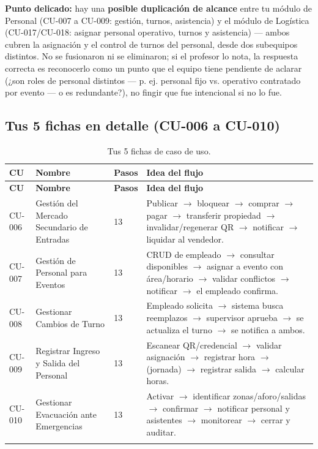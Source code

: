 \documentclass[12pt,a4paper]{article}
\begin{document}
\begin{alerta}
\textbf{Punto delicado:} hay una \textbf{posible duplicación de alcance} entre tu módulo de
Personal (CU-007 a CU-009: gestión, turnos, asistencia) y el módulo de Logística (CU-017/CU-018:
asignar personal operativo, turnos y asistencia) --- ambos cubren la asignación y el control de
turnos del personal, desde dos subequipos distintos. No se fusionaron ni se eliminaron; si el
profesor lo nota, la respuesta correcta es reconocerlo como un punto que el equipo tiene pendiente
de aclarar (¿son roles de personal distintos --- p. ej. personal fijo vs. operativo contratado por
evento --- o es redundante?), no fingir que fue intencional si no lo fue.
\end{alerta}

\subsection{Tus 5 fichas en detalle (CU-006 a CU-010)}

\begin{longtable}{p{1.6cm}p{4cm}p{1.3cm}p{6.9cm}}
\toprule
\textbf{CU} & \textbf{Nombre} & \textbf{Pasos} & \textbf{Idea del flujo}\\
\midrule
\endfirsthead
\toprule
\textbf{CU} & \textbf{Nombre} & \textbf{Pasos} & \textbf{Idea del flujo}\\
\midrule
\endhead
CU-006 & Gestión del Mercado Secundario de Entradas & 13 & Publicar $\to$ bloquear $\to$ comprar
$\to$ pagar $\to$ transferir propiedad $\to$ invalidar/regenerar QR $\to$ notificar $\to$ liquidar
al vendedor.\\[0.4em]
CU-007 & Gestión de Personal para Eventos & 13 & CRUD de empleado $\to$ consultar disponibles $\to$
asignar a evento con área/horario $\to$ validar conflictos $\to$ notificar $\to$ el empleado
confirma.\\[0.4em]
CU-008 & Gestionar Cambios de Turno & 13 & Empleado solicita $\to$ sistema busca reemplazos $\to$
supervisor aprueba $\to$ se actualiza el turno $\to$ se notifica a ambos.\\[0.4em]
CU-009 & Registrar Ingreso y Salida del Personal & 13 & Escanear QR/credencial $\to$ validar
asignación $\to$ registrar hora $\to$ (jornada) $\to$ registrar salida $\to$ calcular horas.\\[0.4em]
CU-010 & Gestionar Evacuación ante Emergencias & 13 & Activar $\to$ identificar zonas/aforo/salidas
$\to$ confirmar $\to$ notificar personal y asistentes $\to$ monitorear $\to$ cerrar y auditar.\\
\bottomrule
\caption{Tus 5 fichas de caso de uso.}
\end{longtable}
\end{document}

